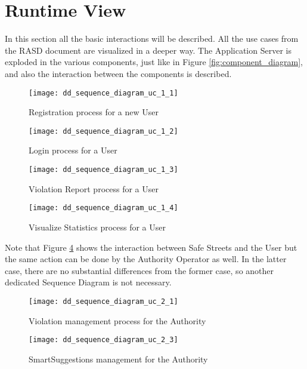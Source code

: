 \section{Runtime View}
In this section all the basic interactions will be described. All the use cases
from the RASD document are visualized in a deeper way. The Application Server is
exploded in the various components, just like in Figure
\ref{fig:component_diagram}, and also the interaction between the components is
described.

\begin{figure}[ht]
    \centering
    \texttt{[image: dd\_sequence\_diagram\_uc\_1\_1]}
    \caption{Registration process for a new User}
    \label{fig:dd_sequence_diagram_uc_1_1}
\end{figure}

\begin{figure}[ht]
    \centering
    \texttt{[image: dd\_sequence\_diagram\_uc\_1\_2]}
    \caption{Login process for a User}
    \label{fig:dd_sequence_diagram_uc_1_2}
\end{figure}

\begin{figure}[ht]
    \centering
    \texttt{[image: dd\_sequence\_diagram\_uc\_1\_3]}
    \caption{Violation Report process for a User}
    \label{fig:dd_sequence_diagram_uc_1_3}
\end{figure}

\clearpage

\begin{figure}[ht]
    \centering
    \texttt{[image: dd\_sequence\_diagram\_uc\_1\_4]}
    \caption{Visualize Statistics process for a User}
    \label{fig:dd_sequence_diagram_uc_1_4}
\end{figure}

Note that Figure \ref{fig:dd_sequence_diagram_uc_1_4} shows the interaction
between Safe Streets and the User but the same action can be done by the
Authority Operator as well. In the latter case, there are no substantial
differences from the former case, so another dedicated Sequence Diagram is not
necessary.

\begin{figure}[ht]
    \centering
    \texttt{[image: dd\_sequence\_diagram\_uc\_2\_1]}
    \caption{Violation management process for the Authority}
    \label{fig:dd_sequence_diagram_uc_2_1}
\end{figure}

\begin{figure}[ht]
    \centering
    \texttt{[image: dd\_sequence\_diagram\_uc\_2\_3]}
    \caption{SmartSuggestions management for the Authority}
    \label{fig:dd_sequence_diagram_uc_2_3}
\end{figure}

